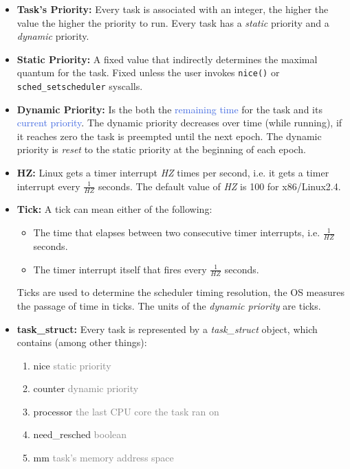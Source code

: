 \documentclass[openany,12pt]{book}
\newcommand{\code}[1]{\texttt{#1}}
\newcommand{\blue}[1]{\textcolor{RoyalBlue}{#1}}
\newcommand{\gray}[1]{\textcolor{gray}{#1}}
\begin{document}
\begin{itemize}
    \item \textbf{Task's Priority:} Every task is associated with an integer, the higher the value the higher the priority to run. Every task has a \textit{static} priority and a \textit{dynamic} priority.
    \item \textbf{Static Priority:} A fixed value that indirectly determines the maximal quantum for the task. Fixed unless the user invokes \code{nice()} or \code{sched\_setscheduler} syscalls.
    \item \textbf{Dynamic Priority:} Is the both the \blue{remaining time} for the task and its \blue{current priority}. The dynamic priority decreases over time (while running), if it reaches zero the task is preempted until the next epoch. The dynamic priority is \textit{reset} to the static priority at the beginning of each epoch.

    \item \textbf{HZ:} Linux gets a timer interrupt \textit{HZ} times per second, i.e. it gets a timer interrupt every \(\frac{1}{\textit{HZ}}\) seconds. The default value of \textit{HZ} is 100 for x86/Linux2.4.

    \item \textbf{Tick:} A tick can mean either of the following:
          \begin{itemize}
              \item The time that elapses between two consecutive timer interrupts, i.e. \(\frac{1}{\textit{HZ}}\) seconds.
              \item The timer interrupt itself that fires every \(\frac{1}{\textit{HZ}}\) seconds.
          \end{itemize}
          Ticks are used to determine the scheduler timing resolution, the OS measures the passage of time in ticks. The units of the \textit{dynamic priority} are ticks.

    \item \textbf{task\_struct:} Every task is represented by a \textit{task\_struct} object, which contains (among other things):
          \begin{enumerate}
              \item nice \gray{static priority}
              \item counter \gray{dynamic priority}
              \item processor \gray{the last CPU core the task ran on}
              \item need\_resched \gray{boolean}
              \item mm \gray{task's memory address space}
          \end{enumerate}


\end{itemize}
\end{document}
